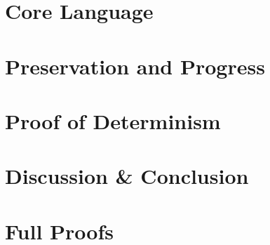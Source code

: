 \documentclass{kththesis}
\begin{document}

\chapter{Core Language}
\label{cha:core_language}


\chapter{Preservation and Progress}
\label{cha:preservation_and_progress}


\chapter{Proof of Determinism}
\label{cha:proof_of_determinism}


\chapter{Discussion \& Conclusion}
\label{cha:disc_concl}


\printbibliography[heading=bibintoc] %

\appendix

\chapter{Full Proofs}
\end{document}
